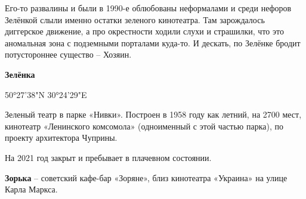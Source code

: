 Его-то развалины и были в 1990-е облюбованы неформалами и среди нефоров Зелёнкой слыли именно остатки зеленого кинотеатра. Там зарождалось диггерское движение, а про окрестности ходили слухи и страшилки, что это аномальная зона с подземными порталами куда-то. И дескать, по Зелёнке бродит потустороннее существо – Хозяин.\\


\medskip

\textbf{Зелёнка}

50°27'38"N 30°24'29"E

Зеленый театр в парке «Нивки». Построен в 1958 году как летний, на 2700 мест, кинотеатр «Ленинского комсомола» (одноименный с этой частью парка), по проекту архитектора Чуприны.

На 2021 год закрыт и пребывает в плачевном состоянии.\\

\medskip

\textbf{Зорька} – советский кафе-бар «Зоряне», близ кинотеатра «Украина» на улице Карла Маркса.\\